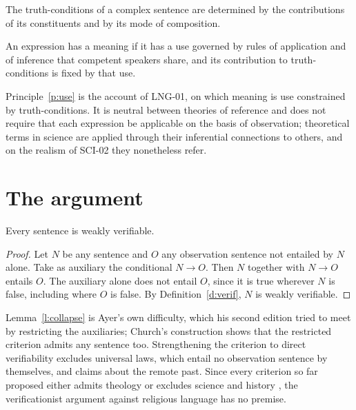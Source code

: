 \documentclass{situationist-preprint}
\begin{document}
\begin{principle}[Compositionality]\label{p:comp}
The truth-conditions of a complex sentence are determined by the contributions of its constituents and by its mode of composition.
\end{principle}

\begin{principle}\label{p:use}
An expression has a meaning if it has a use governed by rules of application and of inference that competent speakers share, and its contribution to truth-conditions is fixed by that use.
\end{principle}

Principle~\ref{p:use} is the account of LNG-01, on which meaning is use constrained by truth-conditions. It is neutral between theories of reference and does not require that each expression be applicable on the basis of observation; theoretical terms in science are applied through their inferential connections to others, and on the realism of SCI-02 they nonetheless refer.

\section{The argument}

\begin{lemma}[Collapse]\label{l:collapse}
Every sentence is weakly verifiable.
\end{lemma}

\begin{proof}
Let $N$ be any sentence and $O$ any observation sentence not entailed by $N$ alone. Take as auxiliary the conditional $N \rightarrow O$. Then $N$ together with $N \rightarrow O$ entails $O$. The auxiliary alone does not entail $O$, since it is true wherever $N$ is false, including where $O$ is false. By Definition~\ref{d:verif}, $N$ is weakly verifiable.
\end{proof}

Lemma~\ref{l:collapse} is Ayer's own difficulty, which his second edition tried to meet by restricting the auxiliaries; Church's construction shows that the restricted criterion admits any sentence too. Strengthening the criterion to direct verifiability excludes universal laws, which entail no observation sentence by themselves, and claims about the remote past. Since every criterion so far proposed either admits theology or excludes science and history \citep{Hempel1950}, the verificationist argument against religious language has no premise.
\end{document}
